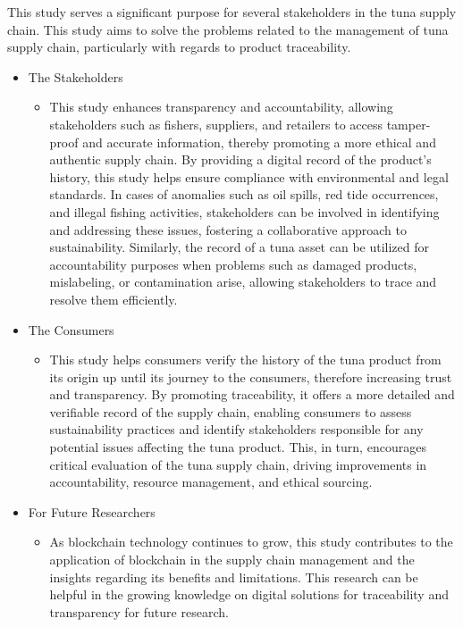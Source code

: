 This study serves a significant purpose for several stakeholders in the tuna supply chain. This study aims to solve the problems related to the management of tuna supply chain, particularly with regards to product traceability.
\begin{itemize}
	\item The Stakeholders 
	\begin{itemize}
		\item This study enhances transparency and accountability, allowing stakeholders such as fishers, suppliers, and retailers to access tamper-proof and accurate information, thereby promoting a more ethical and authentic supply chain. By providing a digital record of the product’s history, this study helps ensure compliance with environmental and legal standards. In cases of anomalies such as oil spills, red tide occurrences, and illegal fishing activities, stakeholders can be involved in identifying and addressing these issues, fostering a collaborative approach to sustainability. Similarly, the record of a tuna asset can be utilized for accountability purposes when problems such as damaged products, mislabeling, or contamination arise, allowing stakeholders to trace and resolve them efficiently.
	\end{itemize}
\end{itemize}
\begin{itemize}
	\item The Consumers
	\begin{itemize}
		\item This study helps consumers verify the history of the tuna product from its origin up until its journey to the consumers, therefore increasing trust and transparency. By promoting traceability, it offers a more detailed and verifiable record of the supply chain, enabling consumers to assess sustainability practices and identify stakeholders responsible for any potential issues affecting the tuna product. This, in turn, encourages critical evaluation of the tuna supply chain, driving improvements in accountability, resource management, and ethical sourcing.
	\end{itemize}
\end{itemize}
\begin{itemize}
	\item For Future Researchers
	\begin{itemize}
		\item As blockchain technology continues to grow, this study contributes to the application of blockchain in the supply chain management and the insights regarding its benefits and limitations. This research can be helpful in the growing knowledge on digital solutions for traceability and transparency for future research. 
	\end{itemize}
\end{itemize}
